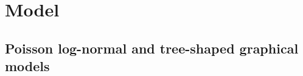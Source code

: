 \section{Model} \label{sec:Model}

\subsection{Poisson log-normal and tree-shaped graphical models}

